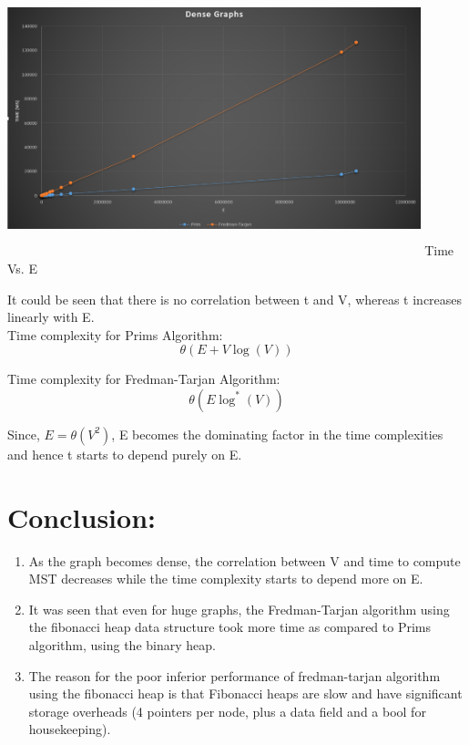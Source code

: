 \documentclass[]{article}
\begin{document}
\begin{center}
	\includegraphics[width=12cm, height=8cm]{Dense_E.png}
	Time Vs. E
\end{center}


	
	It could be seen that there is no correlation between t and V, whereas t increases linearly with E.\\
			
	Time complexity for Prims Algorithm:
	\[ \theta(E + V\log(V)) \]
	
	Time complexity for Fredman-Tarjan Algorithm:
	\[ \theta(E\log^{*}(V))  \] 	
	
	Since, $E = \theta(V^2)$,
	E becomes the dominating factor in the time complexities and hence t starts to depend purely on E.

\section{Conclusion:}

\begin{enumerate}
	\item As the graph becomes dense, the correlation between V and time to compute MST decreases while the time complexity starts to depend more on E.

	\item It was seen that even for huge graphs, the Fredman-Tarjan algorithm using the fibonacci heap data structure took more time as compared to Prims algorithm, using the binary heap.
	
	\item The reason for the poor inferior performance of fredman-tarjan algorithm using the fibonacci heap is that Fibonacci heaps are slow and have significant storage overheads (4 pointers per node, plus a data field and a bool for housekeeping).
\end{enumerate}
\end{document}
